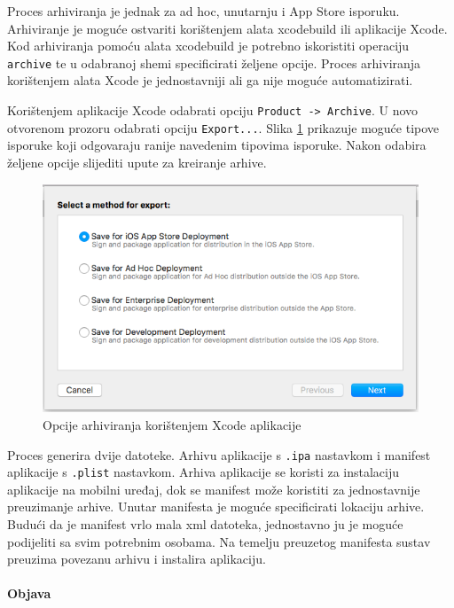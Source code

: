 \documentclass[times, utf8, diplomski, numeric]{fer}
\begin{document}
\begin{appendices}
Proces arhiviranja je jednak za ad hoc, unutarnju i App Store isporuku. Arhiviranje je moguće ostvariti korištenjem alata xcodebuild ili aplikacije Xcode. Kod arhiviranja pomoću alata xcodebuild je potrebno iskoristiti operaciju \verb|archive| te u odabranoj shemi specificirati željene opcije. Proces arhiviranja korištenjem alata Xcode je jednostavniji ali ga nije moguće automatizirati.

Korištenjem aplikacije Xcode odabrati opciju \verb|Product -> Archive|. U novo otvorenom prozoru odabrati opciju \verb|Export...|. Slika \ref{fig:XcodeArchiveOptions} prikazuje moguće tipove isporuke koji odgovaraju ranije navedenim tipovima isporuke. Nakon odabira željene opcije slijediti upute za kreiranje arhive.

\begin{figure}
\centering
\includegraphics[scale=0.5]{XcodeArchiveOptions}
\caption{Opcije arhiviranja korištenjem Xcode aplikacije}
\label{fig:XcodeArchiveOptions}
\end{figure}

Proces generira dvije datoteke. Arhivu aplikacije s \verb|.ipa| nastavkom i manifest aplikacije s \verb|.plist| nastavkom. Arhiva aplikacije se koristi za instalaciju aplikacije na mobilni uređaj, dok se manifest može koristiti za jednostavnije preuzimanje arhive. Unutar manifesta je moguće specificirati lokaciju arhive. Budući da je manifest vrlo mala xml datoteka, jednostavno ju je moguće podijeliti sa svim potrebnim osobama. Na temelju preuzetog manifesta sustav preuzima povezanu arhivu i instalira aplikaciju.

\paragraph{Objava} \label{header:rucna_objaca}


\end{appendices}
\end{document}
